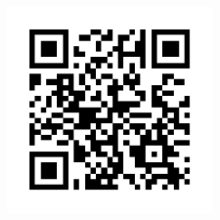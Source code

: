 \documentclass[a0paper,fontscale=0.285]{baposter} %
\begin{document}
\begin{poster}
{\begin{multicols}{2}
  \includegraphics[width=0.45\textwidth]{ldrdoc.pdf}
\end{multicols}

}



\end{poster}
\end{document}
